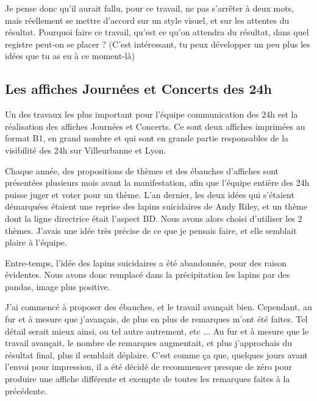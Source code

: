         Je pense donc qu'il aurait fallu, pour ce travail, ne pas s'arrêter à deux mots, mais réellement se mettre d'accord sur un style visuel, et sur les attentes du résultat.
        Pourquoi faire ce travail, qu'est ce qu'on attendra du résultat, dans quel registre peut-on se placer ? (C'est intéressant, tu peux développer un peu plus les idées que tu as eu à ce moment-là)
        
    \subsection{Les affiches Journées et Concerts des 24h}
        
        Un des travaux les plus important pour l'équipe communication des 24h est la réalisation des affiches Journées et Concerts.
        Ce sont deux affiches imprimées au format B1, en grand nombre et qui sont en grande partie responsables de la visibilité des 24h sur Villeurbanne et Lyon.
        
        Chaque année, des propositions de thèmes et des ébauches d'affiches sont présentées plusieurs mois avant la manifestation, afin que l'équipe entière des 24h puisse juger et voter pour un thème.
        L'an dernier, les deux idées qui s'étaient démarquées étaient une reprise des lapins suicidaires de Andy Riley, et un thème dont la ligne directrice était l'aspect BD.
        Nous avons alors choisi d'utiliser les 2 thèmes.
        J'avais une idée très précise de ce que je pensais faire, et elle semblait plaire à l'équipe.
        
        Entre-temps, l'idée des lapins suicidaires a été abandonnée, pour des raison évidentes.
        Nous avons donc remplacé dans la précipitation les lapins par des pandas, image plus positive.
        
        J'ai commencé à proposer des ébauches, et le travail avançait bien.
        Cependant, au fur et à mesure que j'avançais, de plus en plus de remarques m'ont été faites. Tel détail serait mieux ainsi, ou tel autre autrement, etc ...
        Au fur et à mesure que le travail avançait, le nombre de remarques augmentait, et plus j'approchais du résultat final, plus il semblait déplaire.
        C'est comme ça que, quelques jours avant l'envoi pour impression, il a été décidé de recommencer presque de zéro pour produire une affiche différente et exempte de toutes les remarques faites à la précédente.
        
